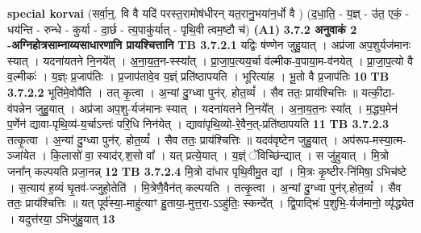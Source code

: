 \documentclass[17pt]{extarticle}
\begin{document}
{{{{{{{{{{{{{{{{{{{                  \newline
                                                        \textbf{special korvai} \newline
              (सर्वा॒न्॒. वि वै यदि॑ परस्त॒रामोष॑धीरन् यत॒रानु॒भया॑न॒र्धो वै ) \newline
                                (द॒धा॒ति॒ - य॒ज्ञ् - उ॑त॒ एकं॒ - धय॑न्ति - रुन्धे - कुर्या - दा॒र्छ - त्य॒पाकु॑र्यात् - पृथि॒वी त्वम॒ष्टौ च॑) \textbf{(A1)} \newline \newline
                \textbf{ 3.7.2     अनुवाकं   2 -अग्निहोत्रसाम्नाय्यसाधारणानि प्रायश्चित्तानि} \newline
                                \textbf{ TB 3.7.2.1} \newline
                  यद्विः ष॑ण्णेन जुहु॒यात् । अप्र॑जा अप॒शुर्यज॑मानः स्यात् । यदना॑यतने नि॒नये᳚त् । अ॒ना॒य॒त॒न-स्स्या᳚त् । प्रा॒जा॒प॒त्यय॒र्चा व॑ल्मीक-व॒पाया॒म-व॑नयेत् । प्रा॒जा॒प॒त्यो वै व॒ल्मीकः॑ । य॒ज्ञ्ः प्र॒जाप॑तिः । प्र॒जाप॑तावे॒व य॒ज्ञ्ं प्रति॑ष्ठापयति । भूरित्या॑ह । भू॒तो वै प्र॒जाप॑तिः \textbf{ 10} \newline
                  \newline
                                \textbf{ TB 3.7.2.2} \newline
                  भूति॑मे॒वोपै॑ति । तत् कृ॒त्वा । अ॒न्यां दु॒ग्ध्वा पुन॑र्. होत॒व्यं᳚ । सैव ततः॒ प्राय॑श्चित्तिः ॥ यत्की॒टा-व॑पन्नेन जुहु॒यात् । अप्र॑जा अप॒शु-र्यज॑मानः स्यात् । यदना॑यतने नि॒नये᳚त् । अ॒ना॒य॒त॒नः स्या᳚त् । म॒द्ध्य॒मेन॑ प॒र्णेन॑ द्यावा-पृथि॒व्य॑-य॒र्चाऽन्तः॑ परि॒धि निन॑येत् । द्यावा॑पृथि॒व्यो-रे॒वैन॒त्-प्रति॑ष्ठापयति \textbf{ 11} \newline
                  \newline
                                \textbf{ TB 3.7.2.3} \newline
                  तत्कृ॒त्वा । अ॒न्यां दु॒ग्ध्वा पुन॑र्. होत॒व्यं᳚ । सैव ततः॒ प्राय॑श्चित्तिः ॥ यदव॑वृष्टेन जुहु॒यात् । अप॑रूप-मस्या॒त्म-ञ्जा॑येत । कि॒लासो॑ वा॒ स्याद॑र्.श॒सो वा᳚ । यत् प्रत्ये॒यात् । य॒ज्ञ्ं ॅविच्छि॑न्द्यात् । स जु॑हुयात् । मि॒त्रो जना᳚न् कल्पयति प्रजा॒नन्न् \textbf{ 12} \newline
                  \newline
                                \textbf{ TB 3.7.2.4} \newline
                  मि॒त्रो दा॑धार पृथि॒वीमु॒त द्यां । मि॒त्रः कृ॒ष्टीर-नि॑मिषा॒ ऽभिच॑ष्टे । स॒त्याय॑ ह॒व्यं घृ॒तव॑-ज्जुहो॒तेति॑ । मि॒त्रेणै॒वैन॑त् कल्पयति । तत्कृ॒त्वा । अ॒न्यां दु॒ग्ध्वा पुन॑र्.होत॒व्यं᳚ । सैव ततः॒ प्राय॑श्चित्तिः ॥ यत् पूर्व॑स्या॒-माहु॑त्याꣳ हु॒ताया॒-मुत्त॒रा-ऽऽहु॑तिः॒ स्कन्दे᳚त् । द्वि॒पाद्भिः॑ प॒शुभि॒-र्यज॑मानो॒ व्यृ॑॑द्ध्येत । यदुत्त॑रया॒ ऽभिजु॑हु॒यात् \textbf{ 13} \newline
}}}}}}}}}}}}}}}}}}}
\end{document}
